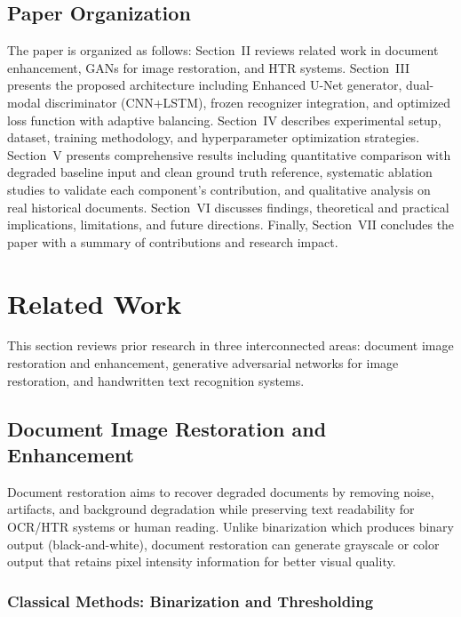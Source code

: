 \documentclass[journal]{IEEEtran}
\begin{document}
\subsection{Paper Organization}

The paper is organized as follows: Section~II reviews related work in document enhancement, GANs for image restoration, and HTR systems. Section~III presents the proposed architecture including Enhanced U-Net generator, dual-modal discriminator (CNN+LSTM), frozen recognizer integration, and optimized loss function with adaptive balancing. Section~IV describes experimental setup, dataset, training methodology, and hyperparameter optimization strategies. Section~V presents comprehensive results including quantitative comparison with degraded baseline input and clean ground truth reference, systematic ablation studies to validate each component's contribution, and qualitative analysis on real historical documents. Section~VI discusses findings, theoretical and practical implications, limitations, and future directions. Finally, Section~VII concludes the paper with a summary of contributions and research impact.

\section{Related Work}

This section reviews prior research in three interconnected areas: document image restoration and enhancement, generative adversarial networks for image restoration, and handwritten text recognition systems.

\subsection{Document Image Restoration and Enhancement}

Document restoration aims to recover degraded documents by removing noise, artifacts, and background degradation while preserving text readability for OCR/HTR systems or human reading. Unlike binarization which produces binary output (black-and-white), document restoration can generate grayscale or color output that retains pixel intensity information for better visual quality.

\subsubsection{Classical Methods: Binarization and Thresholding}
\end{document}
